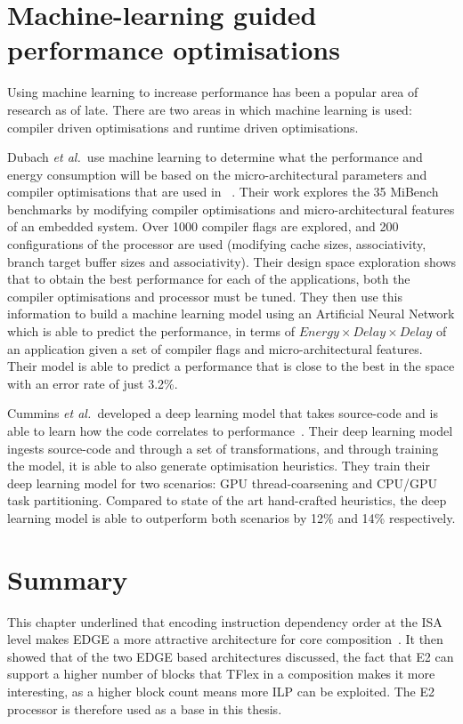 \section{Machine-learning guided performance optimisations}

Using machine learning to increase performance has been a popular area of research as of late.
There are two areas in which machine learning is used: compiler driven optimisations and runtime driven optimisations.

Dubach {\it et al.~}use machine learning to determine what the performance and energy consumption will be based on the micro-architectural parameters and compiler optimisations that are used in ~\cite{DubachExpl2012}.
Their work explores the 35 MiBench benchmarks by modifying compiler optimisations and micro-architectural features of an embedded system.
Over 1000 compiler flags are explored, and 200 configurations of the processor are used (modifying cache sizes, associativity, branch target buffer sizes and associativity).
Their design space exploration shows that to obtain the best performance for each of the applications, both the compiler optimisations and processor must be tuned.
They then use this information to build a machine learning model using an Artificial Neural Network which is able to predict the performance, in terms of $Energy \times Delay \times Delay$ of an application given a set of compiler flags and micro-architectural features.
Their model is able to predict a performance that is close to the best in the space with an error rate of just 3.2\%.

Cummins {\it et al.~}developed a deep learning model that takes source-code and is able to learn how the code correlates to performance~\cite{cummins2017pact}.
Their deep learning model ingests source-code and through a set of transformations, and through training the model, it is able to also generate optimisation heuristics.
They train their deep learning model for two scenarios: GPU thread-coarsening and CPU/GPU task partitioning.
Compared to state of the art hand-crafted heuristics, the deep learning model is able to outperform both scenarios by 12\% and 14\% respectively.
\vspace{-1.5em}
\section{Summary}
This chapter underlined that encoding instruction dependency order at the ISA level makes EDGE a more attractive architecture for core composition~\cite{kim2007tflex}.
It then showed that of the two EDGE based architectures discussed, the fact that E2 can support a higher number of blocks that TFlex in a composition makes it more interesting, as a higher block count means more ILP can be exploited.
The E2 processor is therefore used as a base in this thesis.

